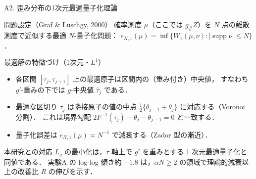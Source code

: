 \documentclass[aspectratio=169, 10pt]{beamer}
\providecommand{\Finv}{}\renewcommand{\Finv}{F^{-1}}
\newcommand{\Lg}{L_g}
\begin{document}
\begin{frame}{A2. 歪み分布の1次元最適量子化理論}
  \begin{block}{問題設定（Graf \& Luschgy, 2000）}
    確率測度 $\mu$（ここでは $g_\# Z$）を $N$ 点の離散測度で近似する最適 $N$-量子化問題：
    $e_{N,1}(\mu)=\inf\{W_1(\mu,\nu) : |\operatorname{supp}\nu|\le N\}$．
  \end{block}
  \begin{block}{最適解の特徴づけ（1次元・$L^1$）}
    \begin{itemize}
      \item 各区間 $[\tau_j,\tau_{j+1}]$ 上の最適原子は区間内の\alert{（重み付き）中央値}，
            すなわち $g'$-重みの下では $g$-中央値 $\hat\tau_j$ である．
      \item 最適な区切り $\tau_j$ は隣接原子の値の中点 $\tfrac12\{\theta_{j-1}+\theta_j\}$ に対応する（Voronoi 分割）．
            これは境界勾配 $2\Finv(\tau_j)-\theta_j-\theta_{j-1}=0$ と一致する．
      \item 量子化誤差は $e_{N,1}(\mu)\asymp N^{-1}$ で減衰する（Zador 型の漸近）．
    \end{itemize}
  \end{block}
  \begin{exampleblock}{本研究との対応}
    $\Lg$ の最小化は，$\tau$ 軸上で $g'$ を重みとする 1 次元最適量子化と同値である．
    実験A の log-log 傾き約 $-1.8$ は，$\alpha N\ge2$ の領域で理論的減衰以上の改善比 $R$ の伸びを示す．
  \end{exampleblock}
\end{frame}
\end{document}
